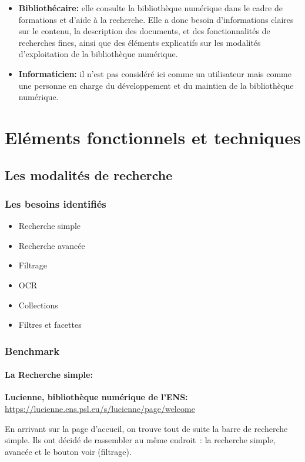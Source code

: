 \begin{itemize}
\item \textbf{Bibliothécaire:} elle consulte la bibliothèque numérique dans le cadre de formations et d’aide à la recherche. Elle a donc besoin d’informations claires sur le contenu, la description des documents, et des fonctionnalités de recherches fines, ainsi que des éléments explicatifs sur les modalités d’exploitation de la bibliothèque numérique.
\item \textbf{Informaticien:} il n’est pas considéré ici comme un utilisateur mais comme une personne en charge du développement et du maintien de la bibliothèque numérique.
\end{itemize}

\section[Eléments fonctionnels]{Eléments fonctionnels et techniques}
\subsection{Les modalités de recherche}
\subsubsection{Les besoins identifiés}

\begin{itemize}
	\item Recherche simple
\item Recherche avancée
\item Filtrage 
\item OCR
\item Collections
\item Filtres et facettes
\end{itemize}

\subsubsection{Benchmark}
\paragraph*{La Recherche simple:}

\textbf{Lucienne, bibliothèque numérique de l’ENS: } 
\url{https://lucienne.ens.psl.eu/s/lucienne/page/welcome}

En arrivant sur la page d’accueil, on trouve tout de suite la barre de recherche simple. Ils ont décidé de rassembler au même endroit : la recherche simple, avancée et le bouton voir (filtrage).

